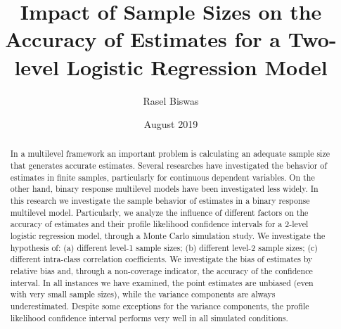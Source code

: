 \documentclass[12pt,oneside,a4paper]{reedthesis}
\title{Impact of Sample Sizes on the Accuracy of Estimates for a Two-level Logistic Regression Model}
\author{Rasel Biswas}
\date{August 2019}
\begin{document}
  \maketitle

\frontmatter %
\pagestyle{empty} %
  \begin{abstract}
    In a multilevel framework an important problem is calculating an adequate sample size that generates accurate estimates. Several researches have investigated the behavior of estimates in finite samples, particularly for continuous dependent variables. On the other hand, binary response multilevel models have been investigated less widely. In this research we investigate the sample behavior of estimates in a binary response multilevel model. Particularly, we analyze the influence of different factors on the accuracy of estimates and their profile likelihood confidence intervals for a 2-level logistic regression model, through a Monte Carlo simulation study. We investigate the hypothesis of: (a) different level-1 sample sizes; (b) different level-2 sample sizes; (c) different intra-class correlation coefficients. We investigate the bias of estimates by relative bias and, through a non-coverage indicator, the accuracy of the confidence interval. In all instances we have examined, the point estimates are unbiased (even with very small sample sizes), while the variance components are always underestimated. Despite some exceptions for the variance components, the profile likelihood confidence interval performs very well in all simulated conditions.
  \end{abstract}
  \hypersetup{linkcolor=black}
  \setcounter{tocdepth}{2}
  \tableofcontents

  \listoftables
\end{document}

